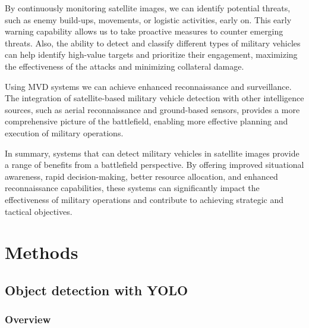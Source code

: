 \documentclass[14pt,a4paper]{extarticle}
\newcounter{e}
\newcounter{pic}
\numberwithin{equation}{section}
\numberwithin{figure}{section}
\begin{document}
By continuously monitoring satellite images, we can identify potential threats, such as enemy build-ups, movements, or logistic activities, early on. This early warning capability allows us to take proactive measures to counter emerging threats. Also, the ability to detect and classify different types of military vehicles can help  identify high-value targets and prioritize their engagement, maximizing the effectiveness of the attacks and minimizing collateral damage.

Using MVD systems we can achieve enhanced reconnaissance and surveillance. The integration of satellite-based military vehicle detection with other intelligence sources, such as aerial reconnaissance and ground-based sensors, provides a more comprehensive picture of the battlefield, enabling more effective planning and execution of military operations.

In summary, systems that can detect military vehicles in satellite images provide a range of benefits from a battlefield perspective. By offering improved situational awareness, rapid decision-making, better resource allocation, and enhanced reconnaissance capabilities, these systems can significantly impact the effectiveness of military operations and contribute to achieving strategic and tactical objectives.

\newpage
\thispagestyle{empty}
\section{Methods}

\subsection{Object detection with YOLO}

\subsubsection{Overview}
\end{document}
